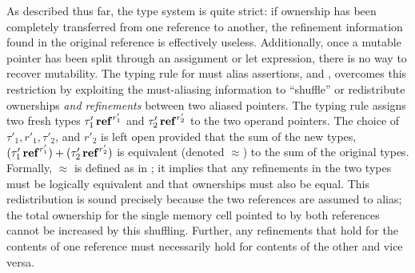 As described thus far, the type system is quite strict: if ownership
has been completely transferred from one reference to another, the
refinement information found in the original reference is effectively useless.
Additionally, once
a mutable pointer has been split through an assignment or let expression, there is no
way to recover mutability. The typing rule for
must alias assertions,  and , overcomes this restriction
by exploiting the must-aliasing information to
``shuffle'' or redistribute ownerships \emph{and refinements} between two
aliased pointers. The typing rule assigns
two fresh types $ \tau'_{{\mathrm{1}}}  \operatorname{\mathbf{ref}}^{ r'_{{\mathrm{1}}} } $ and $ \tau'_{{\mathrm{2}}}  \operatorname{\mathbf{ref}}^{ r'_{{\mathrm{2}}} } $ to the two operand pointers.
The choice of $\tau'_{{\mathrm{1}}}, r'_{{\mathrm{1}}}, \tau'_{{\mathrm{2}}}$, and $r'_{{\mathrm{2}}}$ is left open
provided that the sum of the new types, $(   \tau'_{{\mathrm{1}}}  \operatorname{\mathbf{ref}}^{ r'_{{\mathrm{1}}} }   )  +  (   \tau'_{{\mathrm{2}}}  \operatorname{\mathbf{ref}}^{ r'_{{\mathrm{2}}} }   )$ is
equivalent (denoted $ \approx $) to the sum of the original types.
Formally, $ \approx $ is defined as in ; it implies
that any refinements in the two types must be logically equivalent and
that ownerships must also be equal. 
This redistribution is sound precisely because the two references are
assumed to alias; the total ownership for the single memory cell pointed
to by both references cannot be increased by this shuffling. Further,
any refinements that hold for the contents of one reference must necessarily
hold for contents of the other and vice versa.

